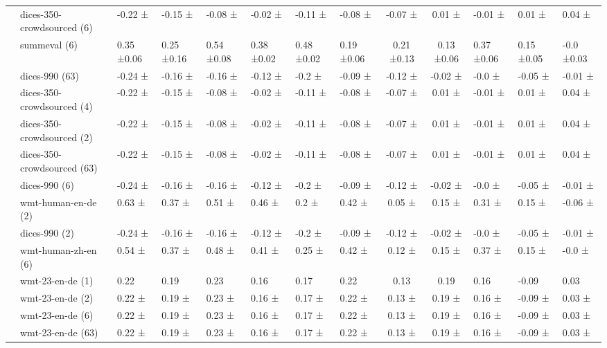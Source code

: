 \begin{tabular}{llllllll|cc}
 & dices-350-crowdsourced (6) & -0.22 ± & -0.15 ± & -0.08 ± & -0.02 ± & -0.11 ± & -0.08 ± & -0.07 ± & 0.01 ± & -0.01 ± & 0.01 ± & 0.04 ± \\
 & summeval (6) & 0.35 ±0.06 & 0.25 ±0.16 & 0.54 ±0.08 & 0.38 ±0.02 & 0.48 ±0.02 & 0.19 ±0.06 & 0.21 ±0.13 & 0.13 ±0.06 & 0.37 ±0.06 & 0.15 ±0.05 & -0.0 ±0.03 \\
 & dices-990 (63) & -0.24 ± & -0.16 ± & -0.16 ± & -0.12 ± & -0.2 ± & -0.09 ± & -0.12 ± & -0.02 ± & -0.0 ± & -0.05 ± & -0.01 ± \\
 & dices-350-crowdsourced (4) & -0.22 ± & -0.15 ± & -0.08 ± & -0.02 ± & -0.11 ± & -0.08 ± & -0.07 ± & 0.01 ± & -0.01 ± & 0.01 ± & 0.04 ± \\
 & dices-350-crowdsourced (2) & -0.22 ± & -0.15 ± & -0.08 ± & -0.02 ± & -0.11 ± & -0.08 ± & -0.07 ± & 0.01 ± & -0.01 ± & 0.01 ± & 0.04 ± \\
 & dices-350-crowdsourced (63) & -0.22 ± & -0.15 ± & -0.08 ± & -0.02 ± & -0.11 ± & -0.08 ± & -0.07 ± & 0.01 ± & -0.01 ± & 0.01 ± & 0.04 ± \\
 & dices-990 (6) & -0.24 ± & -0.16 ± & -0.16 ± & -0.12 ± & -0.2 ± & -0.09 ± & -0.12 ± & -0.02 ± & -0.0 ± & -0.05 ± & -0.01 ± \\
 & wmt-human-en-de (2) & 0.63 ± & 0.37 ± & 0.51 ± & 0.46 ± & 0.2 ± & 0.42 ± & 0.05 ± & 0.15 ± & 0.31 ± & 0.15 ± & -0.06 ± \\
 & dices-990 (2) & -0.24 ± & -0.16 ± & -0.16 ± & -0.12 ± & -0.2 ± & -0.09 ± & -0.12 ± & -0.02 ± & -0.0 ± & -0.05 ± & -0.01 ± \\
 & wmt-human-zh-en (6) & 0.54 ± & 0.37 ± & 0.48 ± & 0.41 ± & 0.25 ± & 0.42 ± & 0.12 ± & 0.15 ± & 0.37 ± & 0.15 ± & -0.0 ± \\
 & wmt-23-en-de (1) & 0.22  & 0.19  & 0.23  & 0.16  & 0.17  & 0.22  & 0.13  & 0.19  & 0.16  & -0.09  & 0.03  \\
 & wmt-23-en-de (2) & 0.22 ± & 0.19 ± & 0.23 ± & 0.16 ± & 0.17 ± & 0.22 ± & 0.13 ± & 0.19 ± & 0.16 ± & -0.09 ± & 0.03 ± \\
 & wmt-23-en-de (6) & 0.22 ± & 0.19 ± & 0.23 ± & 0.16 ± & 0.17 ± & 0.22 ± & 0.13 ± & 0.19 ± & 0.16 ± & -0.09 ± & 0.03 ± \\
 & wmt-23-en-de (63) & 0.22 ± & 0.19 ± & 0.23 ± & 0.16 ± & 0.17 ± & 0.22 ± & 0.13 ± & 0.19 ± & 0.16 ± & -0.09 ± & 0.03 ± \\

\end{tabular}
